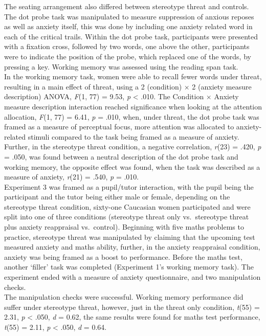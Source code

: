 \documentclass[
  stu,floatsintext]{apa7}
\begin{document}
The seating arrangement also differed between stereotype threat and controls.
The dot probe task was manipulated to measure suppression of anxious reposes as well as anxiety itself, this was done by including one anxiety related word in each of the critical trails.
Within the dot probe task, participants were presented with a fixation cross, followed by two words, one above the other, participants were to indicate the position of the probe, which replaced one of the words, by pressing a key.
Working memory was assessed using the reading span task.\\
In the working memory task, women were able to recall fewer words under threat, resulting in a main effect of threat, using a 2 (condition) \(\times\) 2 (anxiety measure description) ANOVA, \emph{F}(1, 77) = 9.53, \emph{p} \textless{} .010.
The Condition \(\times\) Anxiety measure description interaction reached significance when looking at the attention allocation, \emph{F}(1, 77) = 6.41, \emph{p} = .010, when, under threat, the dot probe task was framed as a measure of perceptual focus, more attention was allocated to anxiety-related stimuli compared to the task being framed as a measure of anxiety.
Further, in the stereotype threat condition, a negative correlation, \emph{r}(23) = .420, \emph{p} = .050, was found between a neutral description of the dot probe task and working memory, the opposite effect was found, when the task was described as a measure of anxiety, \emph{r}(21) = .540, \emph{p} = .010.\\
Experiment 3 was framed as a pupil/tutor interaction, with the pupil being the participant and the tutor being either male or female, depending on the stereotype threat condition, sixty-one Caucasian women participated and were split into one of three conditions (stereotype threat only vs.~stereotype threat plus anxiety reappraisal vs.~control).
Beginning with five maths problems to practice, stereotype threat was manipulated by claiming that the upcoming test measured anxiety and maths ability, further, in the anxiety reappraisal condition, anxiety was being framed as a boost to performance.
Before the maths test, another `filler' task was completed (Experiment 1's working memory task).
The experiment ended with a measure of anxiety questionnaire, and two manipulation checks.\\
The manipulation checks were successful.
Working memory performance did suffer under stereotype threat, however, just in the threat only condition, \emph{t}(55) = 2.31, \emph{p} \textless{} .050, \emph{d} = 0.62, the same results were found for maths test performance, \emph{t}(55) = 2.11, \emph{p} \textless{} .050, \emph{d} = 0.64.
\end{document}
